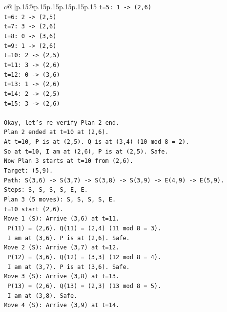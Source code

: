 \documentclass{article}
\begin{document}
{\begin{supertabular}{c@{$\;$}|p{.15\linewidth}@{}p{.15\linewidth}p{.15\linewidth}p{.15\linewidth}p{.15\linewidth}p{.15\linewidth}}
{{{\texttt{t=5: 1 {-}> (2,6)} \\
\texttt{t=6: 2 {-}> (2,5)} \\
\texttt{t=7: 3 {-}> (2,6)} \\
\texttt{t=8: 0 {-}> (3,6)} \\
\texttt{t=9: 1 {-}> (2,6)} \\
\texttt{t=10: 2 {-}> (2,5)} \\
\texttt{t=11: 3 {-}> (2,6)} \\
\texttt{t=12: 0 {-}> (3,6)} \\
\texttt{t=13: 1 {-}> (2,6)} \\
\texttt{t=14: 2 {-}> (2,5)} \\
\texttt{t=15: 3 {-}> (2,6)} \\
\\ 
\texttt{Okay, let's re{-}verify Plan 2 end.} \\
\texttt{Plan 2 ended at t=10 at (2,6).} \\
\texttt{At t=10, P is at (2,5). Q is at (3,4) (10 mod 8 = 2).} \\
\texttt{So at t=10, I am at (2,6), P is at (2,5). Safe.} \\
\texttt{Now Plan 3 starts at t=10 from (2,6).} \\
\texttt{Target: (5,9).} \\
\texttt{Path: S(3,6) {-}> S(3,7) {-}> S(3,8) {-}> S(3,9) {-}> E(4,9) {-}> E(5,9).} \\
\texttt{Steps: S, S, S, S, E, E.} \\
\texttt{Plan 3 (5 moves): S, S, S, S, E.} \\
\texttt{t=10 start (2,6).} \\
\texttt{Move 1 (S): Arrive (3,6) at t=11.} \\
\texttt{  P(11) = (2,6). Q(11) = (2,4) (11 mod 8 = 3).} \\
\texttt{  I am at (3,6). P is at (2,6). Safe.} \\
\texttt{Move 2 (S): Arrive (3,7) at t=12.} \\
\texttt{  P(12) = (3,6). Q(12) = (3,3) (12 mod 8 = 4).} \\
\texttt{  I am at (3,7). P is at (3,6). Safe.} \\
\texttt{Move 3 (S): Arrive (3,8) at t=13.} \\
\texttt{  P(13) = (2,6). Q(13) = (2,3) (13 mod 8 = 5).} \\
\texttt{  I am at (3,8). Safe.} \\
\texttt{Move 4 (S): Arrive (3,9) at t=14.} \\
}}}
\end{supertabular}}
\end{document}
